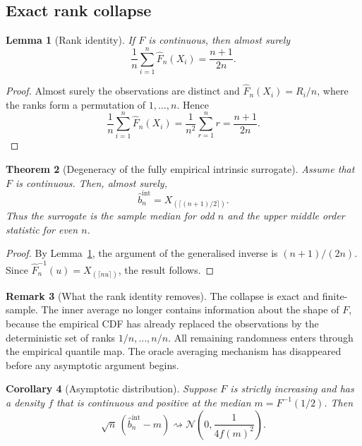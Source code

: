 \documentclass[11pt,a4paper]{article}
\newtheorem{theorem}{Theorem}[section]
\newtheorem{lemma}[theorem]{Lemma}
\newtheorem{corollary}[theorem]{Corollary}
\theoremstyle{definition}
\newtheorem{remark}[theorem]{Remark}
\begin{document}
\subsection{Exact rank collapse}

\begin{lemma}[Rank identity]\label{lem:rank}
If $F$ is continuous, then almost surely
\[
\frac1n\sum_{i=1}^n\widehat F_n(X_i)
=
\frac{n+1}{2n}.
\]
\end{lemma}

\begin{proof}
Almost surely the observations are distinct and $\widehat F_n(X_i)=R_i/n$, where the ranks form a permutation of $1,\ldots,n$. Hence
\[
\frac1n\sum_{i=1}^n\widehat F_n(X_i)
=
\frac1{n^2}\sum_{r=1}^nr
=
\frac{n+1}{2n}.
\]
\end{proof}

\begin{theorem}[Degeneracy of the fully empirical intrinsic surrogate]\label{thm:collapse}
Assume that $F$ is continuous. Then, almost surely,
\[
\widehat b_n^{\mathrm{int}}
=
X_{(\lceil(n+1)/2\rceil)}.
\]
Thus the surrogate is the sample median for odd $n$ and the upper middle order statistic for even $n$.
\end{theorem}

\begin{proof}
By Lemma~\ref{lem:rank}, the argument of the generalised inverse is $(n+1)/(2n)$. Since $\widehat F_n^{-1}(u)=X_{(\lceil nu\rceil)}$, the result follows.
\end{proof}

\begin{remark}[What the rank identity removes]
The collapse is exact and finite-sample. The inner average no longer contains information about the shape of $F$, because the empirical CDF has already replaced the observations by the deterministic set of ranks $1/n,\ldots,n/n$. All remaining randomness enters through the empirical quantile map. The oracle averaging mechanism has disappeared before any asymptotic argument begins.
\end{remark}

\begin{corollary}[Asymptotic distribution]\label{cor:intrinsic-asymptotic}
Suppose $F$ is strictly increasing and has a density $f$ that is continuous and positive at the median $m=F^{-1}(1/2)$. Then
\[
\sqrt n\,(\widehat b_n^{\mathrm{int}}-m)
\rightsquigarrow
\mathcal N\!\left(0,\frac1{4f(m)^2}\right).
\]
\end{corollary}
\end{document}
